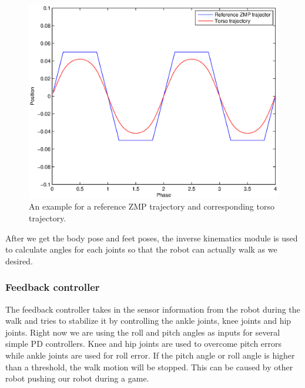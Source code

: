 \documentclass{article}
\begin{document}
\begin{figure}[H]
		\centering
		\includegraphics[width=1\textwidth]{figures/ZMP.eps}
		\caption{An example for a reference ZMP trajectory and corresponding torso trajectory.}
	\end{figure}
After we get the body pose and feet poses, the inverse kinematics module is used to calculate angles for each joints so that the robot can actually walk as we desired.
\subsubsection{Feedback controller}
The feedback controller takes in the sensor information from the robot during the walk and tries to stabilize it by controlling the ankle joints, knee joints and hip joints. Right now we are using the roll and pitch angles as inputs for several simple PD controllers. Knee and hip joints are used to overcome pitch errors while ankle joints are used for roll error. If the pitch angle or roll angle is higher than a threshold, the walk motion will be stopped. This can be caused by other robot pushing our robot during a game.   
\end{document}

